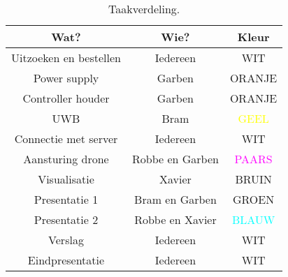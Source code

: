 \begin{table}[p]
	\centering
	\begin{tabular}{ |c|c|c| } \hline
		Wat? & Wie? & Kleur \\ [.5ex] \hline\hline
		Uitzoeken en bestellen & Iedereen & WIT \\ \hline
		Power supply & Garben & \textcolor{RedOrange}{ORANJE} \\ \hline
		Controller houder & Garben & \textcolor{RedOrange}{ORANJE} \\ \hline
		UWB & Bram & \textcolor{Yellow}{GEEL} \\ \hline
		Connectie met server & Iedereen & WIT \\ \hline
		Aansturing drone & Robbe en Garben & \textcolor{Fuchsia}{PAARS} \\ \hline
		Visualisatie & Xavier & \textcolor{Sepia}{BRUIN} \\ \hline
		Presentatie 1 & Bram en Garben & \textcolor{JungleGreen}{GROEN} \\ \hline
		Presentatie 2 & Robbe en Xavier & \textcolor{Cyan}{BLAUW} \\ \hline
		Verslag & Iedereen & WIT \\ \hline
		Eindpresentatie & Iedereen & WIT \\ \hline
	\end{tabular}
	\caption[Taakverdeling]{Taakverdeling.}
	\label{tab:taakverdeling}
\end{table}
